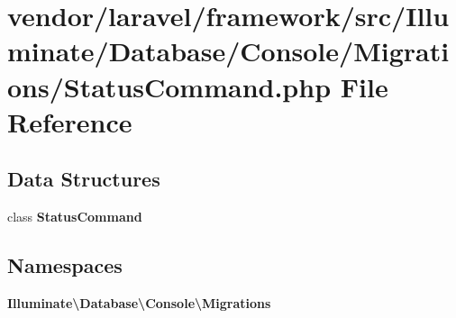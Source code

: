 \section{vendor/laravel/framework/src/\+Illuminate/\+Database/\+Console/\+Migrations/\+Status\+Command.php File Reference}
\label{_status_command_8php}
\subsection*{Data Structures}
\begin{DoxyCompactItemize}
\item 
class {\bf Status\+Command}
\end{DoxyCompactItemize}
\subsection*{Namespaces}
\begin{DoxyCompactItemize}
\item 
 {\bf Illuminate\textbackslash{}\+Database\textbackslash{}\+Console\textbackslash{}\+Migrations}
\end{DoxyCompactItemize}
